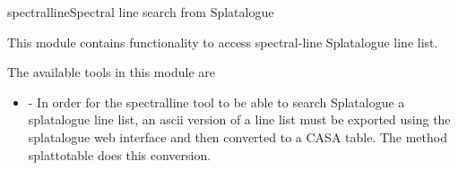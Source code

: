 
\begin{ahmodule}{spectralline}{Spectral line search from Splatalogue}


\bigskip
{} 

This module contains functionality to access 
spectral-line Splatalogue line list.

\noindent The available tools in this module are

\begin{itemize}

\item {} - 
In order for the spectralline tool to be able to search
Splatalogue a splatalogue line list, an ascii version of a line list must be exported
using the splatalogue web interface and then converted to a CASA table. The method
splattotable does this conversion.


\end{itemize}



\end{ahmodule}
